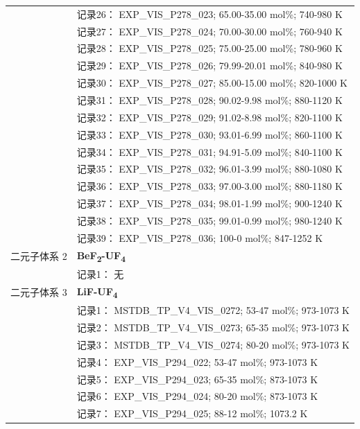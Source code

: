 \documentclass[12pt]{article}
\begin{document}
{\begin{longtable}[]{@{}
  >{\raggedright\arraybackslash}p{}
  >{\raggedright\arraybackslash}p{}@{}}
 & 记录26： EXP\_VIS\_P278\_023; 65.00-35.00 mol\%; 740-980 K \\
 & 记录27： EXP\_VIS\_P278\_024; 70.00-30.00 mol\%; 760-940 K \\
 & 记录28： EXP\_VIS\_P278\_025; 75.00-25.00 mol\%; 780-960 K \\
 & 记录29： EXP\_VIS\_P278\_026; 79.99-20.01 mol\%; 840-980 K \\
 & 记录30： EXP\_VIS\_P278\_027; 85.00-15.00 mol\%; 820-1000 K \\
 & 记录31： EXP\_VIS\_P278\_028; 90.02-9.98 mol\%; 880-1120 K \\
 & 记录32： EXP\_VIS\_P278\_029; 91.02-8.98 mol\%; 820-1100 K \\
 & 记录33： EXP\_VIS\_P278\_030; 93.01-6.99 mol\%; 860-1100 K \\
 & 记录34： EXP\_VIS\_P278\_031; 94.91-5.09 mol\%; 840-1100 K \\
 & 记录35： EXP\_VIS\_P278\_032; 96.01-3.99 mol\%; 880-1080 K \\
 & 记录36： EXP\_VIS\_P278\_033; 97.00-3.00 mol\%; 880-1180 K \\
 & 记录37： EXP\_VIS\_P278\_034; 98.01-1.99 mol\%; 900-1240 K \\
 & 记录38： EXP\_VIS\_P278\_035; 99.01-0.99 mol\%; 980-1240 K \\
 & 记录39： EXP\_VIS\_P278\_036; 100-0 mol\%; 847-1252 K  \\

二元子体系 2 & \textbf{BeF\textsubscript{2}-UF\textsubscript{4}} \\
 & 记录1： 无 \\
二元子体系 3  & \textbf{LiF-UF\textsubscript{4}} \\
 & 记录1： MSTDB\_TP\_V4\_VIS\_0272; 53-47 mol\%; 973-1073 K \\
 & 记录2： MSTDB\_TP\_V4\_VIS\_0273; 65-35 mol\%; 973-1073 K \\
 & 记录3： MSTDB\_TP\_V4\_VIS\_0274; 80-20 mol\%; 973-1073 K \\
 & 记录4： EXP\_VIS\_P294\_022; 53-47 mol\%; 973-1073 K \\
 & 记录5： EXP\_VIS\_P294\_023; 65-35 mol\%; 873-1073 K \\
 & 记录6： EXP\_VIS\_P294\_024; 80-20 mol\%; 873-1073 K \\
 & 记录7： EXP\_VIS\_P294\_025; 88-12 mol\%; 1073.2 K  \\


\end{longtable}}
\end{document}
